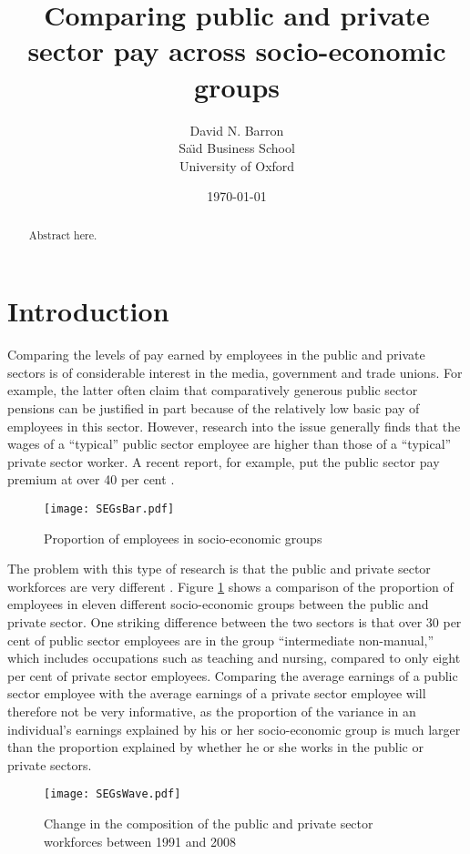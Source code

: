 \documentclass[a4paper,11pt,titlepage]{article}
\title{Comparing public and private sector pay across socio-economic groups}
\author{David N. Barron\\ Sa\"{\i}d Business School\\ University of Oxford}
\date{\today}
\begin{document}
\maketitle

\thispagestyle{fancy}

\begin{abstract}
Abstract here.
\end{abstract}

\section{Introduction}
Comparing the levels of pay earned by employees in the public and private sectors is of considerable interest in the media, government and trade unions.  For example, the latter often claim that comparatively generous public sector pensions can be justified in part because of the relatively low basic pay of employees in this sector.  However, research into the issue generally finds that the wages of a ``typical'' public sector employee are higher than those of a ``typical'' private sector worker.  A recent report, for example, put the public sector pay premium at over 40 per cent \citep{Holmes2011}.

\begin{figure}[htb]
\centering
\texttt{[image: SEGsBar.pdf]}
\caption{Proportion of employees in socio-economic groups\label{fig:segs}}
\end{figure}

The problem with this type of research is that the public and private sector workforces are very different \citep{IDS2011}.  Figure \ref{fig:segs} shows a comparison of the proportion of employees in eleven different socio-economic groups between the public and private sector.  One striking difference between the two sectors is that over 30 per cent of public sector employees are in the group ``intermediate non-manual,'' which includes occupations such as teaching and nursing, compared to only eight per cent of private sector employees.  Comparing the average earnings of a public sector employee with the average earnings of a private sector employee will therefore not be very informative, as the proportion of the variance in an individual's earnings explained by his or her socio-economic group is much larger than the proportion explained by whether he or she works in the public or private sectors.

\begin{figure}[htb]
    \centering
    \texttt{[image: SEGsWave.pdf]}
    \caption{Change in the composition of the public and private sector workforces between 1991 and 2008\label{fig:change}}
\end{figure}
\end{document}
